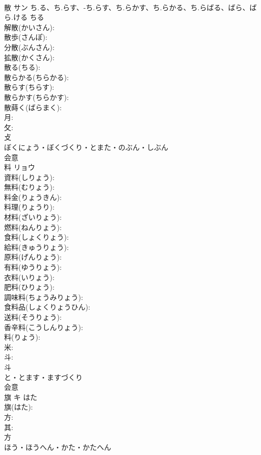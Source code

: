 \documentclass[8pt]{extreport}
\begin{document}
\begin{CJK}{UTF8}{min}
\\	散	サン	ち.る、ち.らす、-ち.らす、ち.らかす、ち.らかる、ち.らばる、ばら、ばら.ける	ちる	
\\	解散(かいさん): 
\\	散歩(さんぽ): 
\\	分散(ぶんさん): 
\\	拡散(かくさん): 
\\	散る(ちる): 
\\	散らかる(ちらかる): 
\\	散らす(ちらす): 
\\	散らかす(ちらかす): 
\\	散蒔く(ばらまく): 
\\	月: 
\\	攵: 
\\	攴	
\\	ぼくにょう・ぼくづくり・とまた・のぶん・しぶん	
\\	会意 
\\	料	リョウ			
\\	資料(しりょう): 
\\	無料(むりょう): 
\\	料金(りょうきん): 
\\	料理(りょうり): 
\\	材料(ざいりょう): 
\\	燃料(ねんりょう): 
\\	食料(しょくりょう): 
\\	給料(きゅうりょう): 
\\	原料(げんりょう): 
\\	有料(ゆうりょう): 
\\	衣料(いりょう): 
\\	肥料(ひりょう): 
\\	調味料(ちょうみりょう): 
\\	食料品(しょくりょうひん): 
\\	送料(そうりょう): 
\\	香辛料(こうしんりょう): 
\\	料(りょう): 
\\	米: 
\\	斗: 
\\	斗	
\\	と・とます・ますづくり	
\\	会意 
\\	旗	キ	はた		
\\	旗(はた): 
\\	方: 
\\	其: 
\\	方	
\\	ほう・ほうへん・かた・かたへん	

\end{CJK}
\end{document}
